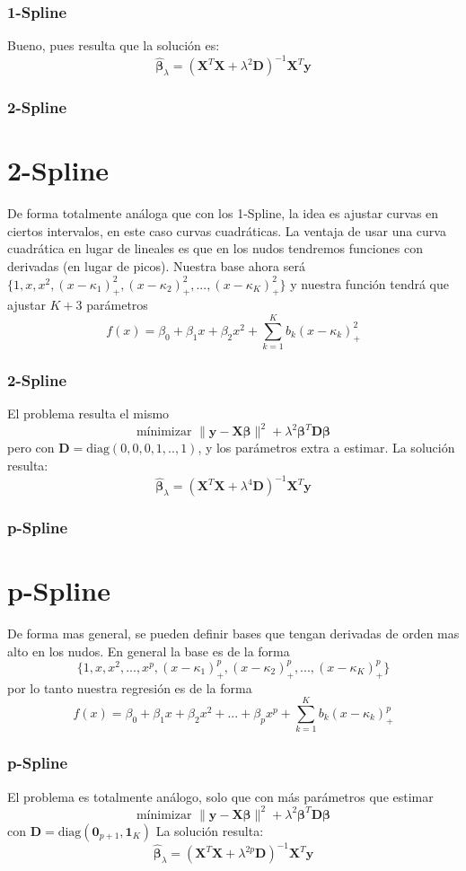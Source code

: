 \documentclass[aspectratio=169,spanish]{beamer}
\begin{document}
\begin{frame}
\frametitle{1-Spline}
Bueno, pues resulta que la solución es:
$$\hat{\bm{\beta}}_\lambda = (\bm{X}^T\bm{X}+\lambda^2\bm{D})^{-1}\bm{X}^T\bm{y} $$
\end{frame}



\begin{frame}
\frametitle{2-Spline}
\section{2-Spline}
De forma totalmente análoga que con los 1-Spline, la idea es ajustar curvas en ciertos intervalos, en este caso curvas cuadráticas. La ventaja de usar una curva cuadrática en lugar de lineales es que en los nudos tendremos funciones con derivadas (en lugar de picos). Nuestra base ahora será $\{1,x,x^2,(x-\kappa_1)^2_{+},(x-\kappa_2)^2_{+},...,(x-\kappa_K)^2_{+}\}$ y nuestra función tendrá que ajustar $K+3$ parámetros
$$ f(x) = \beta_0+\beta_1 x + \beta_2 x^2 +\sum_{k=1}^{K}b_k (x-\kappa_k)^2_{+}$$
\end{frame}


\begin{frame}
\frametitle{2-Spline}
El problema resulta el mismo 
$$\text{mínimizar } \| \bm{y} - \bm{X\beta}\|^2 + \lambda^2\bm{\beta}^T\bm{D}\bm{\beta}$$
pero con $\bm{D} = \text{diag}(0,0,0,1,..,1)$, y los parámetros extra a estimar. 
La solución resulta: 
$$\hat{\bm{\beta}}_\lambda = (\bm{X}^T\bm{X}+\lambda^4\bm{D})^{-1}\bm{X}^T\bm{y} $$
\end{frame}
\begin{frame}
\frametitle{p-Spline}
\section{p-Spline}
De forma mas general, se pueden definir bases que tengan derivadas de orden mas alto en los nudos. En general la base es de la forma $$\{1,x,x^2,...,x^p,(x-\kappa_1)^p_{+},(x-\kappa_2)^p_{+},...,(x-\kappa_K)^p_{+}\}$$
por lo tanto nuestra regresión es de la forma 
$$ f(x) = \beta_0+\beta_1 x + \beta_2 x^2 +...+\beta_p x^p+\sum_{k=1}^{K}b_k (x-\kappa_k)^p_{+}$$

\end{frame}

\begin{frame}
\frametitle{p-Spline}

El problema es totalmente análogo, solo que con más parámetros que estimar 
$$\text{mínimizar } \| \bm{y} - \bm{X\beta}\|^2 + \lambda^2\bm{\beta}^T\bm{D}\bm{\beta}$$
con $\bm{D} = \text{diag}(\bm{0}_{p+1},\bm{1}_{K})$
La solución resulta: 
$$\hat{\bm{\beta}}_\lambda = (\bm{X}^T\bm{X}+\lambda^{2p}\bm{D})^{-1}\bm{X}^T\bm{y} $$
\end{frame}
\end{document}
